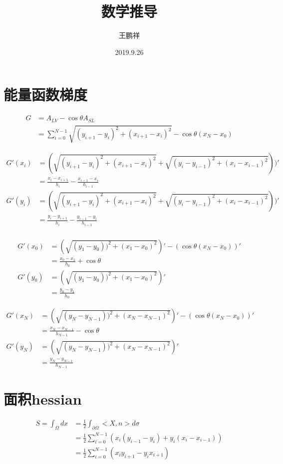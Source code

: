 \documentclass{article}
\begin{document}
\title{数学推导}
\author{王鹏祥}
\date{2019.9.26}
\maketitle

\section{能量函数梯度}
\begin{align*}
G &= A_{LV}-\cos\theta A_{SL} \\
  &=\sum_{i=0}^{N-1}\sqrt{(y_{i+1}-y_{i} )^2+(x_{i+1}-x_{i})^2} - \cos \theta (x_{N}-x_{0})
\end{align*}

\begin{align*}
G'(x_i) &= (\sqrt{(y_{i+1}-y_{i} )^2+(x_{i+1}-x_{i})^2} + \sqrt{(y_{i}-y_{i-1} )^2+(x_{i}-x_{i-1})^2}))'\\
        &=   \frac{x_{i}-x_{i+1}}{h_{i}} - \frac{x_{i-1}-x_{i}}{h_{i-1}}\\
G'(y_i) &= (\sqrt{(y_{i+1}-y_{i} )^2+(x_{i+1}-x_{i})^2} + \sqrt{(y_{i}-y_{i-1} )^2+(x_{i}-x_{i-1})^2}))'\\
        &=   \frac{y_{i}-y_{i+1}}{h_{i}} - \frac{y_{i-1}-y_{i}}{h_{i-1}}\\
\end{align*}

\begin{align*}
G'(x_0) &= (\sqrt{(y_{1}-y_{0}) )^2+(x_{1}-x_{0})^2})'-(\cos\theta(x_{N}-x_{0}))'\\
         &= \frac{x_0-x_1}{h_0} + \cos\theta \\
G'(y_0) &= (\sqrt{(y_{1}-y_{0}) )^2+(x_{1}-x_{0})^2})'\\
         &= \frac{y_0-y_1}{h_0}
\end{align*}


\begin{align*}
G'(x_N) &= (\sqrt{(y_{N}-y_{N-1}) )^2+(x_{N}-x_{N-1})^2})'-(\cos\theta(x_{N}-x_{0}))'\\
         &= \frac{x_N-x_{N-1}}{h_{N-1}} - \cos\theta \\
G'(y_N) &= (\sqrt{(y_{N}-y_{N-1}) )^2+(x_{N}-x_{N-1})^2})'\\
         &= \frac{y_N-y_{N-1}}{h_{N-1}}
\end{align*}



\section{面积hessian}
\begin{align*}
S = \int_\Omega dx &= \frac{1}{2}\int_{\partial \Omega}<X,n>d\sigma\\
                   &= \frac{1}{2}\sum_{i=0}^{N-1}(x_i(y_{i-1}-y_{i})+y_i(x_i-x_{i-1}))\\
                   &=\frac{1}{2}\sum_{i=0}^{N-1}(x_i y_{i+1}- y_i x_{i+1})
\end{align*}
\end{document}
